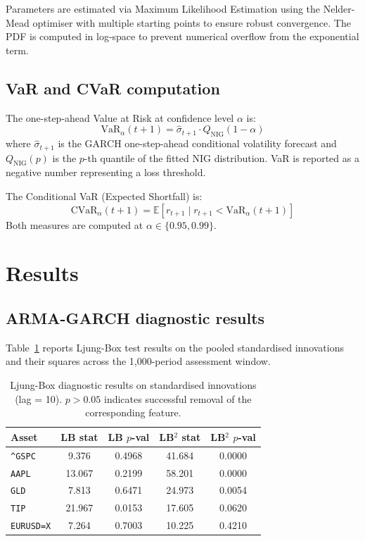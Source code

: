 \documentclass[12pt, a4paper]{article}
\begin{document}
Parameters are estimated via Maximum Likelihood Estimation using the 
Nelder-Mead optimiser with multiple starting points to ensure robust 
convergence. The PDF is computed in log-space to prevent numerical 
overflow from the exponential term.

\subsection{VaR and CVaR computation}

The one-step-ahead Value at Risk at confidence level $\alpha$ is:
\begin{equation}
  \text{VaR}_\alpha(t+1) = \hat{\sigma}_{t+1} \cdot 
  Q_{\text{NIG}}(1 - \alpha)
\end{equation}
where $\hat{\sigma}_{t+1}$ is the GARCH one-step-ahead conditional 
volatility forecast and $Q_{\text{NIG}}(p)$ is the $p$-th quantile 
of the fitted NIG distribution. VaR is reported as a negative 
number representing a loss threshold.

The Conditional VaR (Expected Shortfall) is:
\begin{equation}
  \text{CVaR}_\alpha(t+1) = 
  \mathbb{E}\!\left[r_{t+1} \mid r_{t+1} < 
  \text{VaR}_\alpha(t+1)\right]
\end{equation}
Both measures are computed at $\alpha \in \{0.95, 0.99\}$.

\section{Results}

\subsection{ARMA-GARCH diagnostic results}

Table~\ref{tab:ljungbox} reports Ljung-Box test results on the 
pooled standardised innovations and their squares across the 
1,000-period assessment window.

\begin{table}[H]
\centering
\caption{Ljung-Box diagnostic results on standardised innovations 
(lag = 10). $p > 0.05$ indicates successful removal of the 
corresponding feature.}
\label{tab:ljungbox}
\begin{tabular}{lcccc}
\toprule
\textbf{Asset} & \textbf{LB stat} & \textbf{LB $p$-val} 
  & \textbf{LB$^2$ stat} & \textbf{LB$^2$ $p$-val} \\
\midrule
\texttt{\^{}GSPC}   & 9.376  & 0.4968 & 41.684 & 0.0000 \\
\texttt{AAPL}       & 13.067 & 0.2199 & 58.201 & 0.0000 \\
\texttt{GLD}        & 7.813  & 0.6471 & 24.973 & 0.0054 \\
\texttt{TIP}        & 21.967 & 0.0153 & 17.605 & 0.0620 \\
\texttt{EURUSD=X}   & 7.264  & 0.7003 & 10.225 & 0.4210 \\
\bottomrule
\end{tabular}
\end{table}
\end{document}
